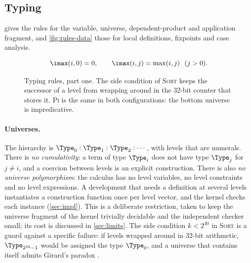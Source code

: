 \subsection{Typing}\label{sec:typing}

 gives the rules for the variable, universe, dependent-product and application fragment, and \cref{fig:rules-data} those for local definitions, fixpoints and case analysis.

\begin{figure}[t]
\centering
{}
\[
\imax(i,0) = 0,\qquad \imax(i,j) = \max(i,j)\ \ (j>0).
\]
\caption{Typing rules, part one.
  The side condition of \textsc{Sort} keeps the successor of a level from wrapping around in the 32-bit counter that stores it.
  \textsc{Pi} is the same in both configurations: the bottom universe is impredicative.}
\label{fig:rules-core}
\end{figure}

\paragraph{Universes.}
The hierarchy is $\Type_0 : \Type_1 : \Type_2 : \cdots$, with levels that are numerals.
There is \emph{no cumulativity}: a term of type $\Type_i$ does not have type $\Type_j$ for $j\neq i$, and a coercion between levels is an explicit construction.
There is also \emph{no universe polymorphism}: the calculus has no level variables, no level constraints and no level expressions.
A development that needs a definition at several levels instantiates a construction function once per level vector, and the kernel checks each instance (\cref{sec:impl}).
This is a deliberate restriction, taken to keep the universe fragment of the kernel trivially decidable and the independent checker small; its cost is discussed in \cref{sec:limits}.
The side condition $k<2^{30}$ in \textsc{Sort} is a guard against a specific failure: if levels wrapped around in 32-bit arithmetic, $\Type_{2^{32}-1}$ would be assigned the type $\Type_0$, and a universe that contains itself admits Girard's paradox \citep{coquand86girard,hurkens95}.

